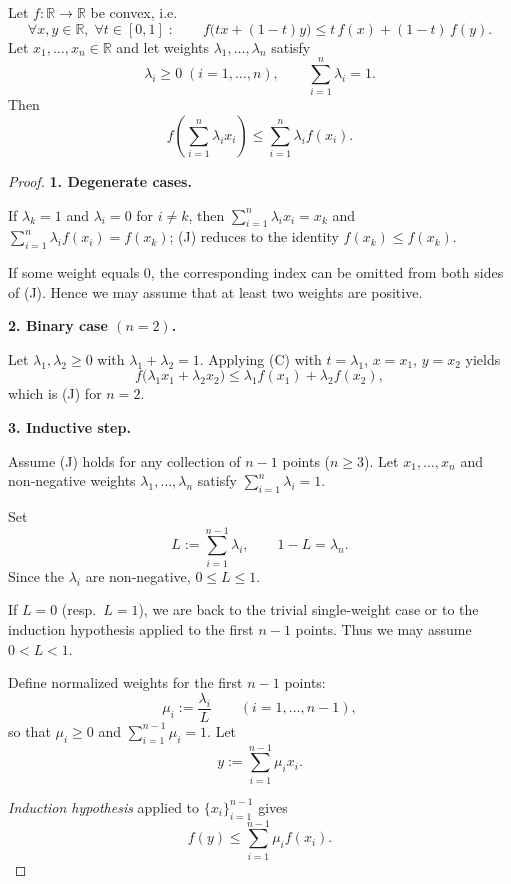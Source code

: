 \begin{theorem}
Let \(f:\mathbb{R}\to\mathbb{R}\) be convex, i.e.  
\[
\forall x,y\in\mathbb{R},\;\forall t\in[0,1]\;:\qquad 
f\bigl(tx+(1-t)y\bigr)\le t\,f(x)+(1-t)\,f(y). \tag{C}
\]
Let \(x_{1},\dots ,x_{n}\in\mathbb{R}\) and let weights \(\lambda_{1},\dots ,\lambda_{n}\) satisfy  
\[
\lambda_{i}\ge 0\;(i=1,\dots ,n),\qquad \sum_{i=1}^{n}\lambda_{i}=1 .
\]
Then  
\[
f\!\left(\sum_{i=1}^{n}\lambda_{i}x_{i}\right)\le 
\sum_{i=1}^{n}\lambda_{i}f(x_{i}). \tag{J}
\]
\end{theorem}

\begin{proof}
\textbf{1. Degenerate cases.}  

If \(\lambda_{k}=1\) and \(\lambda_{i}=0\) for \(i\neq k\), then  
\(\sum_{i=1}^{n}\lambda_{i}x_{i}=x_{k}\) and 
\(\sum_{i=1}^{n}\lambda_{i}f(x_{i})=f(x_{k})\); (J) reduces to the identity  
\(f(x_{k})\le f(x_{k})\).  

If some weight equals \(0\), the corresponding index can be omitted from both
sides of (J). Hence we may assume that at least two weights are positive.

\textbf{2. Binary case \((n=2)\).}  

Let \(\lambda_{1},\lambda_{2}\ge0\) with \(\lambda_{1}+\lambda_{2}=1\).  
Applying (C) with \(t=\lambda_{1}\), \(x=x_{1}\), \(y=x_{2}\) yields  
\[
f\bigl(\lambda_{1}x_{1}+\lambda_{2}x_{2}\bigr)
\le \lambda_{1}f(x_{1})+\lambda_{2}f(x_{2}),
\]
which is (J) for \(n=2\).

\textbf{3. Inductive step.}  

Assume (J) holds for any collection of \(n-1\) points (\(n\ge3\)).
Let \(x_{1},\dots ,x_{n}\) and non‑negative weights \(\lambda_{1},\dots ,\lambda_{n}\) satisfy \(\sum_{i=1}^{n}\lambda_{i}=1\).

Set  
\[
L:=\sum_{i=1}^{n-1}\lambda_{i},\qquad 1-L=\lambda_{n}.
\]
Since the \(\lambda_{i}\) are non‑negative, \(0\le L\le1\).

If \(L=0\) (resp.\ \(L=1\)), we are back to the trivial single‑weight case or to the
induction hypothesis applied to the first \(n-1\) points.  
Thus we may assume \(0<L<1\).

Define normalized weights for the first \(n-1\) points:
\[
\mu_{i}:=\frac{\lambda_{i}}{L}\qquad (i=1,\dots ,n-1),
\]
so that \(\mu_{i}\ge0\) and \(\sum_{i=1}^{n-1}\mu_{i}=1\).  
Let  
\[
y:=\sum_{i=1}^{n-1}\mu_{i}x_{i}.
\]

\textit{Induction hypothesis} applied to \(\{x_{i}\}_{i=1}^{n-1}\) gives  
\begin{equation}
f(y)\le\sum_{i=1}^{n-1}\mu_{i}f(x_{i}). \tag{IH}
\end{equation}


\end{proof}
